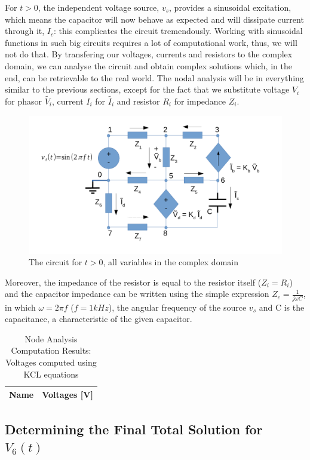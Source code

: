 For $t>0$, the independent voltage source, $v_s$, provides a sinusoidal excitation, which means the capacitor will now behave as expected and will dissipate current through it, $I_c$: this complicates the circuit tremendously. Working with sinusoidal functions in such big circuits requires a lot of computational work, thus, we will not do that. By transfering our voltages, currents and resistors to the complex domain, we can analyse the circuit and obtain complex solutions which, in the end, can be retrievable to the real world. The nodal analysis will be in everything similar to the previous sections, except for the fact that we substitute voltage $V_i$ for phasor $\tilde{V_i}$, current $I_i$ for $\tilde{I_i}$ and resistor $R_i$ for impedance $Z_i$.

\begin{figure}[h] \centering
\includegraphics[width=0.6\linewidth]{t2-t3456.pdf}
\caption{The circuit for $t>0$, all variables in the complex domain}
\label{fig5}
\end{figure}

Moreover, the impedance of the resistor is equal to the resistor itself ($Z_i = R_i$) and the capacitor impedance can be written using the simple expression $Z_c = \frac{1}{j\omega C}$, in which $\omega = 2\pi f$ ($f =  1kHz$), the angular frequency of the source $v_s$ and C is the capacitance, a characteristic of the given capacitor. 

\begin{table}[h]
  \centering
  \begin{tabular}{|l|r|}
    \hline    
    {\bf Name} & {\bf Voltages [V]} \\ \hline
    
  \end{tabular}
  \caption{Node Analysis Computation Results: Voltages computed using KCL equations}
  \label{tab:nodeVoltages4}
\end{table}




\newpage
\subsection{Determining the Final Total Solution for $V_6(t)$}


